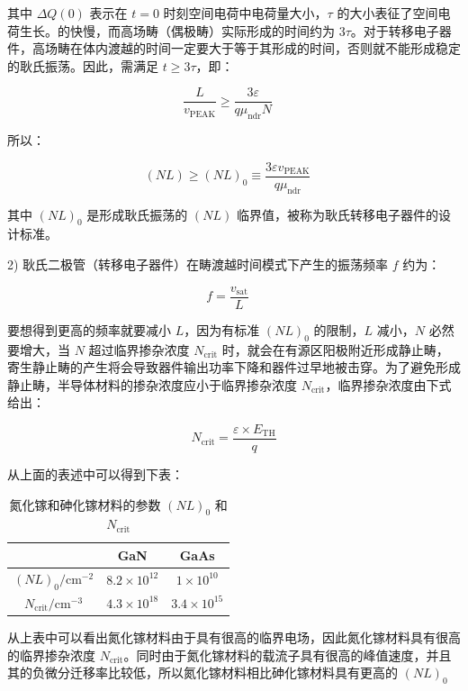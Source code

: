 \documentclass[12pt,hyperref,a4paper,UTF8]{ctexart}
\begin{document}
其中 $\Delta Q(0)$ 表示在 $t=0$ 时刻空间电荷中电荷量大小，$\tau$ 的大小表征了空间电荷生长。的快慢，而高场畴（偶极畴）实际形成的时间约为 $3\tau$。对于转移电子器件，高场畴在体内渡越的时间一定要大于等于其形成的时间，否则就不能形成稳定的耿氏振荡。因此，需满足 $t \geq 3\tau$，即：

\begin{equation}
\frac{L}{v_{\text{PEAK}}} \geq \frac{3\varepsilon}{q\mu_{\text{ndr}} N} \quad
\end{equation}

所以：

\begin{equation}
(NL) \geq (NL)_0 \equiv \frac{3\varepsilon v_{\text{PEAK}}}{q\mu_{\text{ndr}}} \quad 
\end{equation}

其中 $(NL)_0$ 是形成耿氏振荡的 $(NL)$ 临界值，被称为耿氏转移电子器件的设计标准。

2) 耿氏二极管（转移电子器件）在畴渡越时间模式下产生的振荡频率 $f$ 约为：

\begin{equation}
f = \frac{v_{\text{sat}}}{L} \quad 
\end{equation}

要想得到更高的频率就要减小 $L$，因为有标准 $(NL)_0$ 的限制，$L$ 减小，$N$ 必然要增大，当 $N$ 超过临界掺杂浓度 $N_{\text{crit}}$ 时，就会在有源区阳极附近形成静止畴，寄生静止畴的产生将会导致器件输出功率下降和器件过早地被击穿。为了避免形成静止畴，半导体材料的掺杂浓度应小于临界掺杂浓度 $N_{\text{crit}}$，临界掺杂浓度由下式给出：

\begin{equation}
N_{\text{crit}} = \frac{\varepsilon \times E_{\text{TH}}}{q} 
\end{equation}

从上面的表述中可以得到下表：

\begin{table}[h]
\centering
\caption{氮化镓和砷化镓材料的参数 $(NL)_0$ 和 $N_{\text{crit}}$}
\begin{tabular}{|c|c|c|}
\hline
 & GaN & GaAs \\
\hline
$(NL)_0 / \text{cm}^{-2}$ & $8.2 \times 10^{12}$ & $1 \times 10^{10}$ \\
\hline
$N_{\text{crit}} / \text{cm}^{-3}$ & $4.3 \times 10^{18}$ & $3.4 \times 10^{15}$ \\
\hline
\end{tabular}
\end{table}

从上表中可以看出氮化镓材料由于具有很高的临界电场，因此氮化镓材料具有很高的临界掺杂浓度 $N_{\text{crit}}$。同时由于氮化镓材料的载流子具有很高的峰值速度，并且其的负微分迁移率比较低，所以氮化镓材料相比砷化镓材料具有更高的 $(NL)_0$ 
\end{document}
